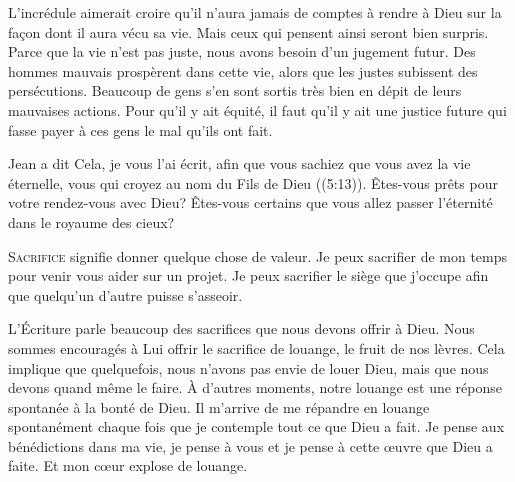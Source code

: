 
L'incrédule aimerait croire qu'il n'aura jamais de comptes à rendre à Dieu
 sur la fa\c{c}on dont il aura vécu sa vie. Mais ceux qui pensent ainsi
 seront bien surpris. Parce que la vie n'est pas juste, nous avons besoin
 d'un jugement futur. Des hommes mauvais prospèrent dans cette vie,
 alors que les justes subissent des persécutions. Beaucoup de gens
 s'en sont sortis très bien en dépit de leurs mauvaises actions.
 Pour qu'il y ait équité, il faut qu'il y ait une justice future
 qui fasse payer à ces gens le mal qu'ils ont fait. 

Jean a dit\frcolon {}
 \Og Cela, je vous l'ai écrit, afin que vous sachiez que vous avez
 la vie éternelle, vous qui croyez au nom du Fils de Dieu \Fg{}
 ((5:13)).
 Êtes-vous prêts pour votre rendez-vous avec Dieu?
 Êtes-vous certains que vous allez passer l'éternité
 dans le royaume des cieux? 

\dvrule






\lettrine{S}{acrifice} signifie donner quelque chose de valeur.
 Je peux sacrifier de mon temps pour venir vous aider sur un projet.
 Je peux sacrifier le siège que j'occupe afin que quelqu'un d'autre
 puisse s'asseoir. 

L'Écriture parle beaucoup des sacrifices que nous devons offrir à Dieu.
 Nous sommes encouragés à Lui offrir le sacrifice de louange,
 le fruit de nos lèvres. Cela implique que quelquefois, nous n'avons pas envie
 de louer Dieu, mais que nous devons quand même le faire.
 À d'autres moments, notre louange est une réponse spontanée
 à la bonté de Dieu. Il m'arrive de me répandre en louange spontanément
 chaque fois que je contemple tout ce que Dieu a fait.
 Je pense aux bénédictions dans ma vie, je pense à vous et je pense
 à cette \oe{}uvre que Dieu a faite. Et mon c\oe{}ur explose de louange. 

